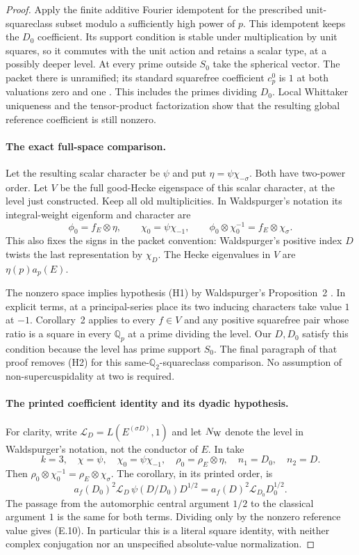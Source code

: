 \documentclass[11pt]{article}
\theoremstyle{definition}
\theoremstyle{remark}
\newcommand{\Q}{\mathbb Q}
\begin{document}
\begin{proof}
Apply the finite additive Fourier idempotent for the prescribed
unit-squareclass subset modulo a sufficiently high power of $p$.
This idempotent keeps the $D_0$ coefficient. Its support condition
is stable under multiplication by unit squares, so it commutes
with the unit action and retains a scalar type, at a possibly
deeper level. At every prime outside $S_0$ take the spherical vector.
The packet there is unramified; its standard squarefree coefficient
$c_p^0$ is $1$ at both valuations zero and one
\cite[Section~I.3, pp.~377--378]{waldspurger}.
This includes the primes dividing $D_0$. Local Whittaker uniqueness
and the tensor-product factorization show that the resulting
global reference coefficient is still nonzero.

\paragraph{The exact full-space comparison.}
Let the resulting scalar character be $\psi$ and put
$\eta=\psi\chi_{-\sigma}$. Both have two-power order.
Let $V$ be the full good-Hecke eigenspace of this scalar character,
at the level just constructed. Keep all old multiplicities. In
Waldspurger's notation its integral-weight eigenform and character are
\[
 \phi_0=f_E\otimes\eta,\qquad
 \chi_0=\psi\chi_{-1},\qquad
 \phi_0\otimes\chi_0^{-1}=f_E\otimes\chi_\sigma .
\]
This also fixes the signs in the packet convention: Waldspurger's
positive index $D$ twists the last representation by $\chi_D$.
The Hecke eigenvalues in $V$ are $\eta(p)a_p(E)$.

The nonzero space implies hypothesis (H1) by Waldspurger's
Proposition~2 \cite[Section~I.2, p.~377]{waldspurger}. In explicit terms, at a principal-series
place its two inducing characters take value $1$ at $-1$.
Corollary~2 \cite[pp.~483--484]{waldspurger} applies to every $f\in V$ and any
positive squarefree pair whose ratio is a square in every
$\Q_p$ at a prime dividing the level. Our $D,D_0$ satisfy
this condition because the level has prime support $S_0$.
The final paragraph of that proof removes (H2) for this
same-$\Q_2$-squareclass comparison. No assumption of
non-supercuspidality at two is required.

\paragraph{The printed coefficient identity and its dyadic hypothesis.}
For clarity, write $\mathcal L_D=L(E^{(\sigma D)},1)$ and let
$N_{\rm W}$ denote the level in Waldspurger's notation, not the
conductor of $E$. In \cite[Corollary~2, pp.~483--484]{waldspurger}
take
\[
 k=3,\quad \chi=\psi,\quad \chi_0=\psi\chi_{-1},\quad
 \rho_0=\rho_E\otimes\eta,\quad n_1=D_0,\quad n_2=D.
\]
Then $\rho_0\otimes\chi_0^{-1}=\rho_E\otimes\chi_\sigma$.
The corollary, in its printed order, is
\[
 a_f(D_0)^2\mathcal L_D\,\psi(D/D_0)D^{1/2}
   =a_f(D)^2\mathcal L_{D_0}D_0^{1/2}.
\]
The passage from the automorphic central argument $1/2$ to the
classical argument $1$ is the same for both terms. Dividing only
by the nonzero reference value gives (E.10). In particular this
is a literal square identity, with neither complex conjugation
nor an unspecified absolute-value normalization.


\end{proof}
\end{document}
